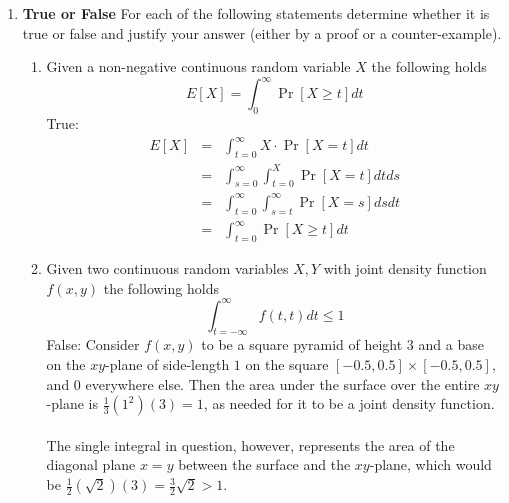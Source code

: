 \documentclass[11pt,fleqn]{article}
\begin{document}
\begin{enumerate}

\item \textbf{True or False}
For each of the following statements determine whether it is true or false and justify your answer (either by a proof or a counter-example).

\begin{enumerate}
\item Given a non-negative continuous random variable $X$ the following holds
$$E[X]=\int_{0}^{\infty}\Pr[X\geq t]dt$$
True:
\begin{eqnarray*}
E[X] &=& \int_{t=0}^{\infty} X\cdot \Pr[X=t]dt \\
&=& \int_{s=0}^{\infty} \int_{t=0}^{X} \Pr[X=t]dtds \\
&=& \int_{t=0}^{\infty} \int_{s=t}^{\infty} \Pr[X=s]dsdt \\
&=& \int_{t=0}^{\infty} \Pr[X\geq t]dt
\end{eqnarray*}
\item Given two continuous random variables $X, Y$ with joint density function $f(x,y)$ the following holds
$$\int_{t=-\infty}^{\infty}f(t,t)dt\leq 1$$
False: Consider $f(x,y)$ to be a square pyramid of height $3$ and a base on the $xy$-plane of side-length $1$ on the square $[-0.5,0.5]\times[-0.5,0.5]$, and $0$ everywhere else. Then the area under the surface over the entire $xy$-plane is $\frac13(1^2)(3) = 1$, as needed for it to be a joint density function. \\\\
The single integral in question, however, represents the area of the diagonal plane $x=y$ between the surface and the $xy$-plane, which would be $\frac12(\sqrt2)(3) = \frac32\sqrt2 > 1$.
\end{enumerate}


\end{enumerate}
\end{document}
